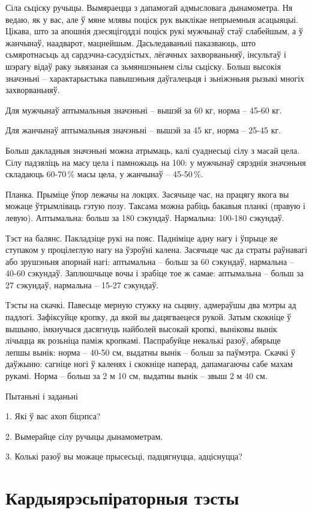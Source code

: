 Сіла сьціску ручыцы. Вымяраецца з дапамогай адмысловага дынамометра. Ня ведаю, як у вас, але ў мяне млявы поціск рук выклікае непрыемныя асацыяцыі. Цікава, што за апошнія дзесяцігоддзі поціск рукі мужчынаў стаў слабейшым, а ў жанчынаў, наадварот, мацнейшым. Дасьледаваньні паказваюць, што сьмяротнасьць ад сардэчна-сасудзістых, лёгачных захворваньняў, інсультаў і шэрагу відаў раку зьвязаная са зьмяншэньнем сілы сьціску. Больш высокія значэньні – характарыстыка павышэньня даўгалецьця і зьніжэньня рызыкі многіх захворваньняў.

Для мужчынаў аптымальныя значэньні -- вышэй за 60 кг, норма -- 45-60 кг. 

Для жанчынаў аптымальныя значэньні -- вышэй за 45 кг, норма -- 25-45 кг. 

Больш дакладныя значэньні можна атрымаць, калі суаднесьці сілу з масай цела. Сілу падзяліць на масу цела і памножыць на 100: у мужчынаў сярэднія значэньня складаюць 60-70\,\% масы цела, у жанчынаў – 45-50\,\%.

Планка. Прыміце ўпор лежачы на локцях. Засячыце час, на працягу якога вы можаце ўтрымліваць гэтую позу. Таксама можна рабіць бакавыя планкі (правую і левую). Аптымальна: больш за 180 сэкундаў. Нармальна: 100-180 сэкундаў.

Тэст на балянс. Пакладзіце рукі на пояс. Падніміце адну нагу і ўпрыце яе ступаком у процілеглую нагу на ўзроўні калена. Засячыце час да страты раўнавагі або зрушэньня апорнай нагі: аптымальна – больш за 60 сэкундаў, нармальна – 40-60 сэкундаў. Заплюшчыце вочы і зрабіце тое ж самае: аптымальна – больш за 27 сэкундаў, нармальна – 15-27 сэкундаў.

Тэсты на скачкі. Павесьце мерную стужку на сьцяну, адмераўшы два мэтры ад падлогі. Зафіксуйце кропку, да якой вы дацягваецеся рукой. Затым скокніце ў вышыню, імкнучыся дасягнуць найболей высокай кропкі, выніковы вынік лічыцца як розьніца паміж кропкамі. Паспрабуйце некалькі разоў, абярыце лепшы вынік: норма – 40-50 см, выдатны вынік – больш за паўмэтра. Скачкі ў даўжыню: сагніце ногі ў каленях і скокніце наперад, дапамагаючы сабе махам рукамі. Норма – больш за 2 м 10 см, выдатны вынік – звыш 2 м 40 см.

Пытаньні і заданьні

1. Які ў вас ахоп біцэпса?

2. Вымерайце сілу ручыцы дынамометрам.

3. Колькі разоў вы можаце прысесьці, падцягнуцца, адціснуцца?


\section{Кардыярэсьпіраторныя тэсты}

